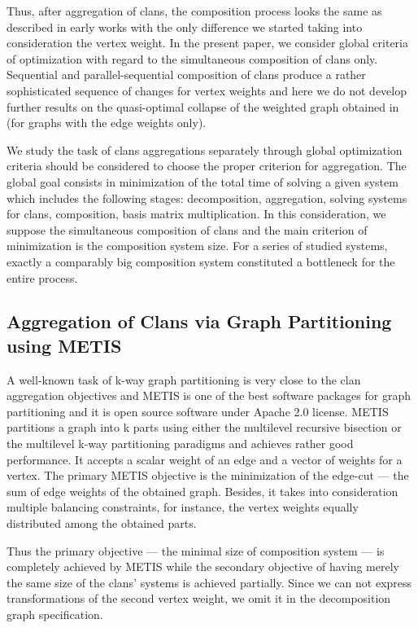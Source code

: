 \documentclass[10pt, a5paper]{article}
\begin{document}
Thus, after aggregation of clans, the composition process looks the same as described in early works with the only difference we started taking into consideration the vertex weight. In the present paper, we consider global criteria of optimization with regard to the simultaneous composition of clans only. Sequential and parallel-sequential \linebreak composition of clans produce a rather sophisticated sequence of changes for vertex weights and here we do not develop further results on the quasi-optimal collapse of the weighted graph obtained in (for graphs with the edge weights only).

We study the task of clans aggregations separately through global optimization criteria should be considered to choose the proper criterion for aggregation. The global goal consists in minimization of the total time of solving a given system which includes the following stages: decomposition, aggregation, solving systems for clans, composition, \linebreak basis matrix multiplication. In this consideration, we suppose the \linebreak simultaneous composition of clans and the main criterion of \linebreak minimization is the composition system size. For a series of studied systems, exactly a comparably big composition system constituted a bottleneck for the entire process.

\subsection*{Aggregation of Clans via Graph Partitioning using METIS}

A well-known task of k-way graph partitioning is very close to the clan aggregation objectives and METIS \cite{bib7} is one of the best software packages for graph partitioning and it is open source software under Apache 2.0 license. METIS partitions a graph into k parts using either the multilevel recursive bisection or the multilevel k-way partitioning paradigms and achieves rather good performance. It accepts a scalar weight of an edge and a vector of weights for a vertex. The primary METIS objective is the minimization of the edge-cut --- the sum of edge weights of the obtained graph. Besides, it takes into consideration multiple balancing constraints, for instance, the vertex weights equally distributed among the obtained parts.

Thus the primary objective --- the minimal size of composition system --- is completely achieved by METIS while the secondary \linebreak objective of having merely the same size of the clans' systems is achieved partially. Since we can not express transformations of the second vertex weight, we omit it in the decomposition graph specification.
\end{document}
